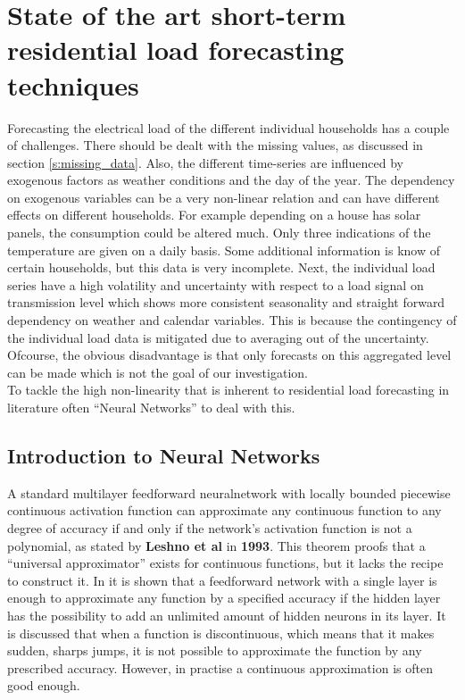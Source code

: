 \chapter{State of the art short-term residential load forecasting techniques}
\label{cha:State of the art short-term residential load forecasting techniques}
Forecasting the electrical load of the different individual households has a couple of challenges. There should be dealt with the missing values, as discussed in section \ref{s:missing_data}. Also, the different time-series are influenced by exogenous factors as weather conditions and the day of the year. The dependency on exogenous variables can be a very non-linear relation and can have different effects on different households. For example depending on a house has solar panels, the consumption could be altered much. Only three indications of the temperature are given on a daily basis. Some additional information is know of certain households, but this data is very incomplete. Next, the individual load series have a high volatility and uncertainty with respect to a load signal on transmission level which shows more consistent seasonality and straight forward dependency on weather and calendar variables. This is because the contingency of the individual load data is mitigated due to averaging out of the uncertainty. Ofcourse, the obvious disadvantage is that only forecasts on this aggregated level can be made which is not the goal of our investigation.\\ To tackle the high non-linearity that is inherent to residential load forecasting in literature often ``Neural Networks'' to deal with this.

\section{Introduction to Neural Networks}
A  standard multilayer feedforward neuralnetwork with locally bounded piecewise continuous activation function can approximate any continuous function to any degree of accuracy if and only if the network's activation function is not a polynomial, as stated by \textbf{Leshno et al} in \textbf{1993}. This theorem proofs that a ``universal approximator'' exists for continuous functions, but it lacks the recipe to construct it. In \cite{Nielsen2015} it is shown that a feedforward network with a single layer is enough to approximate any function by a specified accuracy if the hidden layer has the possibility to add an unlimited amount of hidden neurons in its layer. It is discussed that when a function is discontinuous, which means that it makes sudden, sharps jumps, it is not possible to approximate the function by any prescribed accuracy. However, in practise a continuous approximation is often good enough.\\


